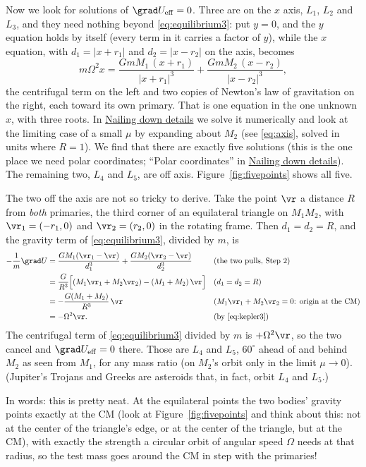 \documentclass[12pt]{article}
\numberwithin{equation}{section}
\newcommand{\Om}{\Omega}
\newcommand{\Ueff}{U_{\rm eff}}
\newcommand{\sideroads}{\hyperref[sec:sideroads]{Nailing down details}}
\begin{document}
\noindent Now we look for solutions of $\grad\Ueff = 0$. Three are on the $x$ axis, $L_1$,
$L_2$ and $L_3$, and they need nothing beyond \eqref{eq:equilibrium3}: put $y = 0$, and the
$y$ equation holds by itself (every term in it carries a factor of $y$), while the $x$ equation,
with $d_1 = |x + r_1|$ and $d_2 = |x - r_2|$ on the axis, becomes
\begin{equation}
  \label{eq:axisfull}
  m\Om^2 x = \frac{GmM_1\,(x + r_1)}{|x + r_1|^3} + \frac{GmM_2\,(x - r_2)}{|x - r_2|^3},
\end{equation}
the centrifugal term on the left and two copies of Newton's law of gravitation on
the right, each toward its own primary. That is one equation in the one unknown
$x$, with three roots. In \sideroads{} we solve it numerically and look at
the limiting case of a small $\mu$ by expanding about $M_2$ (see \eqref{eq:axis},
solved in units where $R = 1$). We find that there are exactly five solutions
(this is the one place we need polar coordinates; ``Polar coordinates'' in
\sideroads{}). The remaining two, $L_4$ and $L_5$, are off axis.
Figure~\ref{fig:fivepoints} shows all five.

The two off the axis are not so tricky to derive. Take the point $\vr$ a distance $R$ from
\emph{both} primaries, the third corner of an equilateral triangle on $M_1M_2$, with
$\vr_1 = (-r_1, 0)$ and $\vr_2 = (r_2, 0)$ in the rotating frame. Then $d_1 = d_2 = R$, and the
gravity term of \eqref{eq:equilibrium3}, divided by $m$, is
\begin{align}
  -\frac1m\grad U &= \frac{GM_1(\vr_1 - \vr)}{d_1^3} + \frac{GM_2(\vr_2 - \vr)}{d_2^3}
  && \text{(the two pulls, Step 2)} \nonumber\\
  &= \frac{G}{R^3}\Bigl[(M_1\vr_1 + M_2\vr_2) - (M_1 + M_2)\,\vr\Bigr]
  && (d_1 = d_2 = R) \nonumber\\
  &= -\frac{G(M_1 + M_2)}{R^3}\,\vr
  && (M_1\vr_1 + M_2\vr_2 = 0\text{: origin at the CM}) \nonumber\\
  &= -\Om^2\vr .
  && \text{(by \eqref{eq:kepler3})}
\end{align}
The centrifugal term of \eqref{eq:equilibrium3} divided by $m$ is $+\Om^2\vr$, so the two cancel
and $\grad\Ueff = 0$ there.
Those are $L_4$ and $L_5$, $60^\circ$ ahead of and behind $M_2$ as seen from $M_1$, for any mass
ratio (on $M_2$'s orbit only in the limit $\mu \to 0$). (Jupiter's Trojans and
Greeks are asteroids that, in fact, orbit $L_4$ and $L_5$.)

In words: this is pretty neat. At the equilateral points the two bodies' gravity
points exactly at the CM (look at Figure~\ref{fig:fivepoints} and think about this: not at the
center of the triangle's edge, or at the center of the triangle, but at the CM),
with exactly the strength a circular orbit of angular speed $\Om$ needs at that
radius, so the test mass goes around the CM in step with the primaries!
\end{document}
